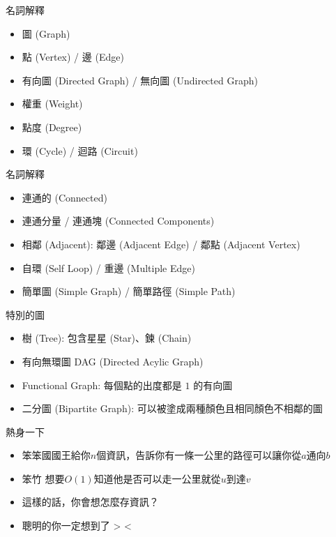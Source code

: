 \documentclass[aspectratio=169]{beamer}
\begin{document}
    \begin{frame}{名詞解釋}
        \begin{itemize}
            \item 圖 (Graph)
            \item 點 (Vertex) / 邊 (Edge)
            \item 有向圖 (Directed Graph) / 無向圖 (Undirected Graph)
            \item 權重 (Weight)
            \item 點度 (Degree)
            \item 環 (Cycle) / 迴路 (Circuit)
        \end{itemize}
    \end{frame}
    
    \begin{frame}{名詞解釋}
        \begin{itemize}
            \item 連通的 (Connected)
            \item 連通分量 / 連通塊 (Connected Components)
            \item 相鄰 (Adjacent): 鄰邊 (Adjacent Edge) / 鄰點 (Adjacent Vertex)
            \item 自環 (Self Loop) / 重邊 (Multiple Edge)
            \item 簡單圖 (Simple Graph) / 簡單路徑 (Simple Path)
        \end{itemize}
    \end{frame}
    
    \begin{frame}{特別的圖}
        \begin{itemize}
            \item 樹 (Tree): 包含星星 (Star)、鍊 (Chain)
            \item 有向無環圖 DAG (Directed Acylic Graph)
            \item Functional Graph: 每個點的出度都是 $1$ 的有向圖
            \item 二分圖 (Bipartite Graph): 可以被塗成兩種顏色且相同顏色不相鄰的圖
        \end{itemize}
    \end{frame}
    
    \begin{frame}{熱身一下}
        \begin{itemize}
            \item 笨笨國國王給你$n$個資訊，告訴你有一條一公里的路徑可以讓你從$a$通向$b$
            \item<2-> 笨竹 想要$O(1)$知道他是否可以走一公里就從$u$到達$v$
            \item<3-> 這樣的話，你會想怎麼存資訊？
            \item<4-> 聰明的你一定想到了 > <
        \end{itemize}
    \end{frame}
    
\end{document}
